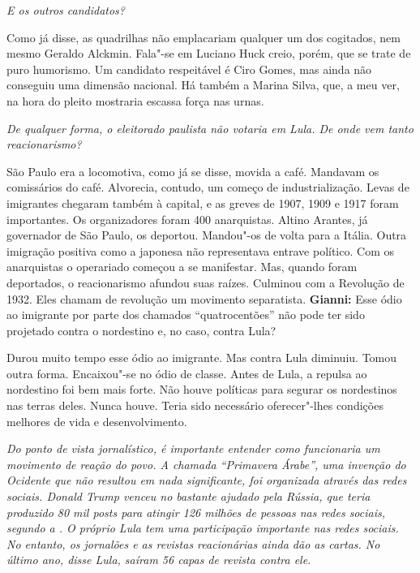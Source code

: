 \itshape
 E os outros candidatos?

\normalfont 
Como já disse, as quadrilhas não emplacariam qualquer um
dos cogitados, nem mesmo Geraldo Alckmin. Fala"-se em Luciano Huck creio,
porém, que se trate de puro humorismo. Um candidato respeitável é Ciro
Gomes, mas ainda não conseguiu uma dimensão nacional. Há também a Marina
Silva, que, a meu ver, na hora do pleito mostraria escassa força nas
urnas.

\itshape
 De qualquer forma, o eleitorado paulista não votaria em
Lula. De onde vem tanto reacionarismo?

\normalfont 
São Paulo era a locomotiva, como já se disse, movida a
café. Mandavam os comissários do café. Alvorecia, contudo, um começo de
industrialização. Levas de imigrantes chegaram também à capital, e as
greves de 1907, 1909 e 1917 foram importantes. Os organizadores foram
400 anarquistas. Altino Arantes, já governador de São Paulo, os
deportou. Mandou"-os de volta para a Itália. Outra imigração positiva
como a japonesa não representava entrave político. Com os anarquistas o
operariado começou a se manifestar. Mas, quando foram deportados, o
reacionarismo afundou suas raízes. Culminou com a Revolução de 1932.
Eles chamam de revolução um movimento separatista. \textbf{Gianni:} Esse
ódio ao imigrante por parte dos chamados ``quatrocentões'' não pode ter
sido projetado contra o nordestino e, no caso, contra Lula?

\normalfont 
Durou muito tempo esse ódio ao imigrante. Mas contra Lula
diminuiu. Tomou outra forma. Encaixou"-se no ódio de classe. Antes de
Lula, a repulsa ao nordestino foi bem mais forte. Não houve políticas
para segurar os nordestinos nas terras deles. Nunca houve. Teria sido
necessário oferecer"-lhes condições melhores de vida e desenvolvimento.

\itshape
 Do ponto de vista jornalístico, é importante entender
como funcionaria um movimento de reação do povo. A chamada ``Primavera
Árabe'', uma invenção do Ocidente que não resultou em nada significante,
foi organizada através das redes sociais. Donald Trump venceu no 
bastante ajudado pela Rússia, que teria produzido 80 mil \emph{posts}
para atingir 126 milhões de pessoas nas redes sociais, segundo a . O
próprio Lula tem uma participação importante nas redes sociais. No
entanto, os jornalões e as revistas reacionárias ainda dão as cartas. No
último ano, disse Lula, saíram 56 capas de revista contra ele.


